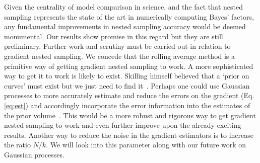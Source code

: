 Given the centrality of model comparison in science, and the fact that nested sampling represents the state of the art in numerically computing Bayes’ factors, any fundamental improvements in nested sampling accuracy would be deemed monumental. Our results show promise in this regard but they are still preliminary. Further work and scrutiny must be carried out in relation to gradient nested sampling. We concede that the rolling average method is a primitive way of getting gradient nested sampling to work. A more sophisticated way to get it to work is likely to exist. Skilling himself believed that a `prior on curves' must exist but we just need to find it~\cite{10.1214/06-BA127,paris2022}. Perhaps one could use Gaussian processes to more accurately estimate and reduce the errors on the gradient (Eq. \ref{eq:est}) and accordingly incorporate the error information into the estimates of the prior volume~\cite{paris2022}. This would be a more robust and rigorous way to get gradient nested sampling to work and even further improve upon the already exciting results. Another way to reduce the noise in the gradient estimators is to increase the ratio $N/k$. We will look into this parameter along with our future work on Gaussian processes.

